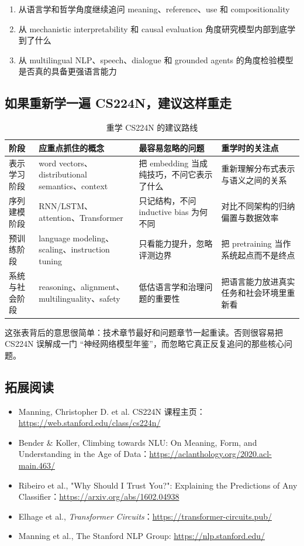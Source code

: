 \documentclass[a4paper]{article}
\begin{document}
\begin{enumerate}
    \item 从语言学和哲学角度继续追问 meaning、reference、use 和 compositionality
    \item 从 mechanistic interpretability 和 causal evaluation 角度研究模型内部到底学到了什么
    \item 从 multilingual NLP、speech、dialogue 和 grounded agents 的角度检验模型是否真的具备更强语言能力
\end{enumerate}

\subsection{如果重新学一遍 CS224N，建议这样重走}

\begin{table}[H]
\centering
\begin{tabular}{p{} p{} p{} p{}}
\toprule
阶段 & 应重点抓住的概念 & 最容易忽略的问题 & 重学时的关注点 \\
\midrule
表示学习阶段 & word vectors、distributional semantics、context & 把 embedding 当成纯技巧，不问它表示了什么 & 重新理解分布式表示与语义之间的关系 \\
序列建模阶段 & RNN/LSTM、attention、Transformer & 只记结构，不问 inductive bias 为何不同 & 对比不同架构的归纳偏置与数据效率 \\
预训练阶段 & language modeling、scaling、instruction tuning & 只看能力提升，忽略评测边界 & 把 pretraining 当作系统起点而不是终点 \\
系统与社会阶段 & reasoning、alignment、multilinguality、safety & 低估语言学和治理问题的重要性 & 把语言能力放进真实任务和社会环境里重新看 \\
\bottomrule
\end{tabular}
\caption{重学 CS224N 的建议路线}
\end{table}

这张表背后的意思很简单：技术章节最好和问题章节一起重读。否则很容易把 CS224N 误解成一门 ``神经网络模型年鉴''，而忽略它真正反复追问的那些核心问题。

\subsection{拓展阅读}

\begin{itemize}
    \item Manning, Christopher D. et al. CS224N 课程主页：\url{https://web.stanford.edu/class/cs224n/}
    \item Bender \& Koller, Climbing towards NLU: On Meaning, Form, and Understanding in the Age of Data：\url{https://aclanthology.org/2020.acl-main.463/}
    \item Ribeiro et al., "Why Should I Trust You?": Explaining the Predictions of Any Classifier：\url{https://arxiv.org/abs/1602.04938}
    \item Elhage et al., \emph{Transformer Circuits}：\url{https://transformer-circuits.pub/}
    \item Manning et al., The Stanford NLP Group: \url{https://nlp.stanford.edu/}
\end{itemize}
\end{document}
